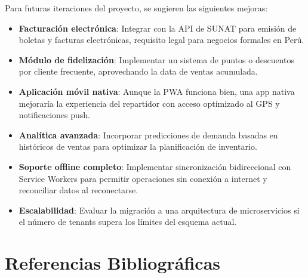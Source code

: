 \documentclass[12pt, a4paper]{article}
\begin{document}
Para futuras iteraciones del proyecto, se sugieren las siguientes mejoras:

\begin{itemize}[leftmargin=2cm]
    \item \textbf{Facturación electrónica}: Integrar con la API de SUNAT para emisión de boletas y facturas electrónicas, requisito legal para negocios formales en Perú.
    \item \textbf{Módulo de fidelización}: Implementar un sistema de puntos o descuentos por cliente frecuente, aprovechando la data de ventas acumulada.
    \item \textbf{Aplicación móvil nativa}: Aunque la PWA funciona bien, una app nativa mejoraría la experiencia del repartidor con acceso optimizado al GPS y notificaciones push.
    \item \textbf{Analítica avanzada}: Incorporar predicciones de demanda basadas en históricos de ventas para optimizar la planificación de inventario.
    \item \textbf{Soporte offline completo}: Implementar sincronización bidireccional con Service Workers para permitir operaciones sin conexión a internet y reconciliar datos al reconectarse.
    \item \textbf{Escalabilidad}: Evaluar la migración a una arquitectura de microservicios si el número de tenants supera los límites del esquema actual.
\end{itemize}

\section{Referencias Bibliográficas}
\end{document}
